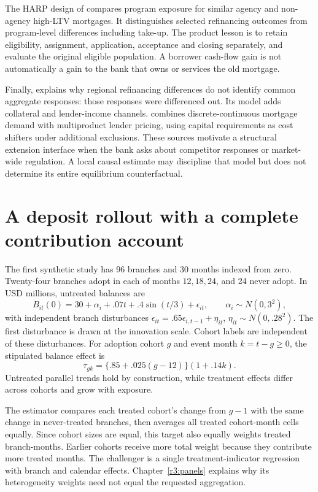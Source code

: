 The HARP design of \citet[printed pp.2--3]{agarwal2020} compares program
exposure for similar agency and non-agency high-LTV mortgages. It
distinguishes selected refinancing outcomes from program-level
differences including take-up. The product lesson is to retain eligibility,
assignment, application, acceptance and closing separately, and evaluate
the original eligible population. A borrower cash-flow gain is not
automatically a gain to the bank that owns or services the old mortgage.

Finally, \citet[printed pp.112--113]{beraja2019} explains why regional
refinancing differences do not identify common aggregate responses:
those responses were differenced out. Its model adds collateral and
lender-income channels. \citet[pp.5--6]{benetton2021} combines
discrete-continuous mortgage demand with multiproduct lender pricing,
using capital requirements as cost shifters under additional exclusions.
These sources motivate a structural extension interface when the bank
asks about competitor responses or market-wide regulation. A local
causal estimate may discipline that model but does not determine its
entire equilibrium counterfactual.

\section{A deposit rollout with a complete contribution account}
\label{r3:deposit-study}

The first synthetic study has 96 branches and 30 months indexed from zero.
Twenty-four branches adopt in each of months $12,18,24$, and 24 never
adopt. In USD millions, untreated balances are
\[
 B_{it}(0)=30+\alpha_i+.07t+.4\sin(t/3)+\epsilon_{it},
 \qquad \alpha_i\sim N(0,3^2),
\]
with independent branch disturbances
$\epsilon_{it}=.65\epsilon_{i,t-1}+\eta_{it}$,
$\eta_{it}\sim N(0,.28^2)$. The first disturbance is drawn at the
innovation scale. Cohort labels are independent of these disturbances.
For adoption cohort $g$ and event month $k=t-g\ge0$, the stipulated
balance effect is
\[
 \tau_{gk}=\{.85+.025(g-12)\}(1+.14k).
\]
Untreated parallel trends hold by construction, while treatment effects
differ across cohorts and grow with exposure.

The estimator compares each treated cohort's change from $g-1$ with
the same change in never-treated branches, then averages all treated
cohort-month cells equally. Since cohort sizes are equal, this target
also equally weights treated branch-months. Earlier cohorts receive
more total weight because they contribute more treated months.
The challenger is a single treatment-indicator regression with branch
and calendar effects. Chapter~\ref{r3:panels} explains why its
heterogeneity weights need not equal the requested aggregation.

